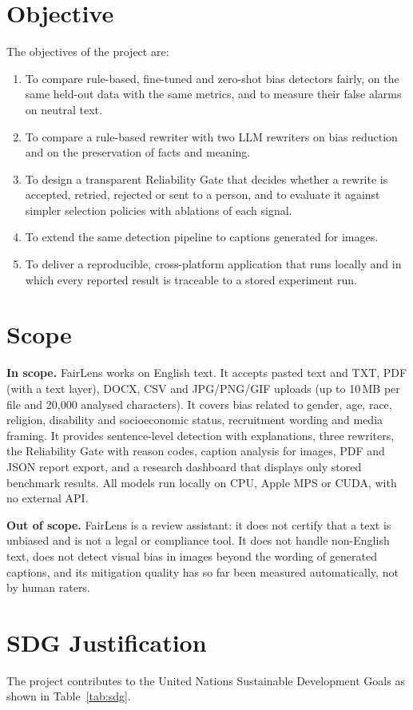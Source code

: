 \documentclass[12pt,a4paper,oneside]{report}
\begin{document}
\section{Objective}
The objectives of the project are:
\begin{enumerate}[label=O\arabic*.]
\item To compare rule-based, fine-tuned and zero-shot bias detectors fairly, on the same held-out data with the same
metrics, and to measure their false alarms on neutral text.
\item To compare a rule-based rewriter with two LLM rewriters on bias reduction and on the preservation of facts and
meaning.
\item To design a transparent Reliability Gate that decides whether a rewrite is accepted, retried, rejected or sent to
a person, and to evaluate it against simpler selection policies with ablations of each signal.
\item To extend the same detection pipeline to captions generated for images.
\item To deliver a reproducible, cross-platform application that runs locally and in which every reported result is
traceable to a stored experiment run.
\end{enumerate}

\section{Scope}
\textbf{In scope.} FairLens works on English text. It accepts pasted text and TXT, PDF (with a text layer), DOCX, CSV
and JPG/PNG/GIF uploads (up to 10\,MB per file and 20,000 analysed characters). It covers bias related to gender, age,
race, religion, disability and socioeconomic status, recruitment wording and media framing. It provides sentence-level
detection with explanations, three rewriters, the Reliability Gate with reason codes, caption analysis for images, PDF
and JSON report export, and a research dashboard that displays only stored benchmark results. All models run locally
on CPU, Apple MPS or CUDA, with no external API.

\textbf{Out of scope.} FairLens is a review assistant: it does not certify that a text is unbiased and is not a legal
or compliance tool. It does not handle non-English text, does not detect visual bias in images beyond the wording of
generated captions, and its mitigation quality has so far been measured automatically, not by human raters.

\section{SDG Justification}
The project contributes to the United Nations Sustainable Development Goals as shown in Table~\ref{tab:sdg}.
\end{document}
